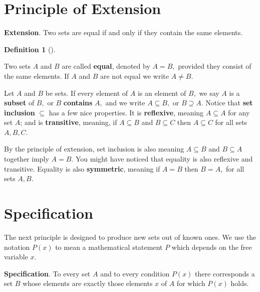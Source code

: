 \documentclass[
  letterpaper,
  10pt,
  reqno,
  twopage,
  openany]{book}
\theoremstyle{plain}
\theoremstyle{definition}
\theoremstyle{definition}
\newtheorem{definition}{Definition}[chapter]
\theoremstyle{definition}
\theoremstyle{plain}
\theoremstyle{plain}
\theoremstyle{remark}
\begin{document}
\hypertarget{principle-of-extension}{%
\section{Principle of Extension}\label{principle-of-extension}}

\textbf{Extension}. Two sets are equal if and only if
they contain the same elements.

\leavevmode{}%
\begin{definition}[]\label{def-equal}

Two sets \(A\) and \(B\) are called \textbf{equal}, denoted
by \(A=B,\) provided they consist of the same elements. If \(A\) and
\(B\) are not equal we write \(A\neq B.\)

\end{definition}

Let \(A\) and \(B\) be sets. If every element of \(A\) is an element of
\(B,\) we say \(A\) is a  \textbf{subset} of \(B,\) or
\(B\)  \textbf{contains} \(A,\) and we write
\(A\subseteq B,\) or \(B\supseteq A.\) Notice that 
\textbf{set inclusion} \(\subseteq\) has a few nice properties. It is
 \textbf{reflexive}, meaning \(A\subseteq A\) for any
set \(A\); and is  \textbf{transitive}, meaning, if
\(A \subseteq B\) and \(B\subseteq C\) then \(A\subseteq C\) for all
sets \(A, B, C.\)

By the principle of extension, set inclusion is also
 meaning \(A\subseteq B\) and \(B\subseteq A\)
together imply \(A=B.\) You might have noticed that equality is also
reflexive and transitive. Equality is also
\textbf{symmetric}, meaning if \(A=B\) then \(B=A,\)
for all sets \(A, B.\)

\hypertarget{specification}{%
\section{Specification}\label{specification}}

The next principle is designed to produce new sets out of known ones. We
use the notation \(P(x)\) to mean a mathematical statement \(P\) which
depends on the free variable \(x.\)

\textbf{Specification}. To every set \(A\) and to every condition
\(P(x)\) there corresponds a set \(B\) whose elements are exactly those
elements \(x\) of \(A\) for which \(P(x)\) holds.
\end{document}
